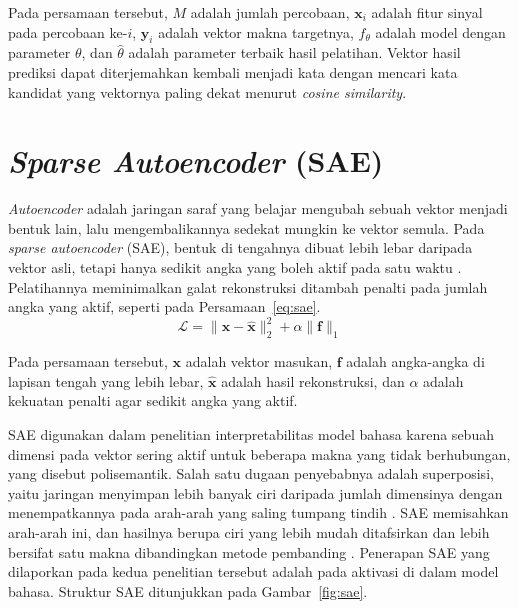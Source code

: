 Pada persamaan tersebut, $M$ adalah jumlah percobaan, $\mathbf{x}_i$ adalah fitur sinyal pada percobaan ke-$i$, $\mathbf{y}_i$ adalah vektor makna targetnya, $f_{\theta}$ adalah model dengan parameter $\theta$, dan $\hat{\theta}$ adalah parameter terbaik hasil pelatihan.
Vektor hasil prediksi dapat diterjemahkan kembali menjadi kata dengan mencari kata kandidat yang vektornya paling dekat menurut \textit{cosine similarity}.

\section{\textit{Sparse Autoencoder} (SAE)}
\label{sec:sae}
\textit{Autoencoder} adalah jaringan saraf yang belajar mengubah sebuah vektor menjadi bentuk lain, lalu mengembalikannya sedekat mungkin ke vektor semula.
Pada \textit{sparse autoencoder} (SAE), bentuk di tengahnya dibuat lebih lebar daripada vektor asli, tetapi hanya sedikit angka yang boleh aktif pada satu waktu \parencite{bricken2023,cunningham2023}.
Pelatihannya meminimalkan galat rekonstruksi ditambah penalti pada jumlah angka yang aktif, seperti pada Persamaan~\ref{eq:sae}.
\begin{equation}
\mathcal{L} = \lVert \mathbf{x} - \hat{\mathbf{x}} \rVert_2^{2} + \alpha \lVert \mathbf{f} \rVert_1
\label{eq:sae}
\end{equation}

Pada persamaan tersebut, $\mathbf{x}$ adalah vektor masukan, $\mathbf{f}$ adalah angka-angka di lapisan tengah yang lebih lebar, $\hat{\mathbf{x}}$ adalah hasil rekonstruksi, dan $\alpha$ adalah kekuatan penalti agar sedikit angka yang aktif.

SAE digunakan dalam penelitian interpretabilitas model bahasa karena sebuah dimensi pada vektor sering aktif untuk beberapa makna yang tidak berhubungan, yang disebut polisemantik.
Salah satu dugaan penyebabnya adalah superposisi, yaitu jaringan menyimpan lebih banyak ciri daripada jumlah dimensinya dengan menempatkannya pada arah-arah yang saling tumpang tindih \parencite{cunningham2023}.
SAE memisahkan arah-arah ini, dan hasilnya berupa ciri yang lebih mudah ditafsirkan dan lebih bersifat satu makna dibandingkan metode pembanding \parencite{bricken2023,cunningham2023}.
Penerapan SAE yang dilaporkan pada kedua penelitian tersebut adalah pada aktivasi di dalam model bahasa.
Struktur SAE ditunjukkan pada Gambar~\ref{fig:sae}.

